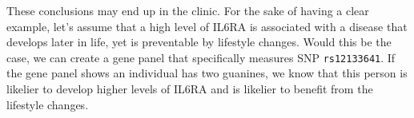 These conclusions may end up in the clinic.
For the sake of having a clear example,
let's assume that a high level of IL6RA 
is associated with a disease that develops later in life,
yet is preventable by lifestyle changes.
Would this be the case, we can create a gene panel that specifically measures
SNP \verb|rs12133641|. 
If the gene panel shows an individual has two guanines, 
we know that this person is likelier to develop higher levels of
IL6RA and is likelier to benefit from the lifestyle changes.

